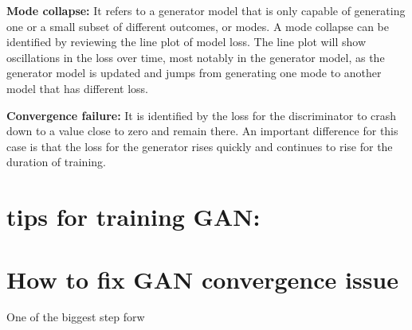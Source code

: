 \documentclass{article}
\begin{document}
\textbf{Mode collapse:} It  refers to a generator model that is only capable of generating one or a small subset of different outcomes, or modes. A mode collapse can be identified by reviewing the line plot of model loss. The line plot will show oscillations in the loss over time, most notably in the generator model, as the generator model is updated and jumps from generating one mode to another model that has different loss.

\textbf{Convergence failure:} It is identified by the loss for the discriminator to crash down to a value close to zero and remain there. An important difference for this case is that the loss for the generator rises quickly and continues to rise for the duration of training.

\section{tips for training GAN:}



\section{How to fix GAN convergence issue}

    
One of the biggest step forw



%

 
\end{document}
